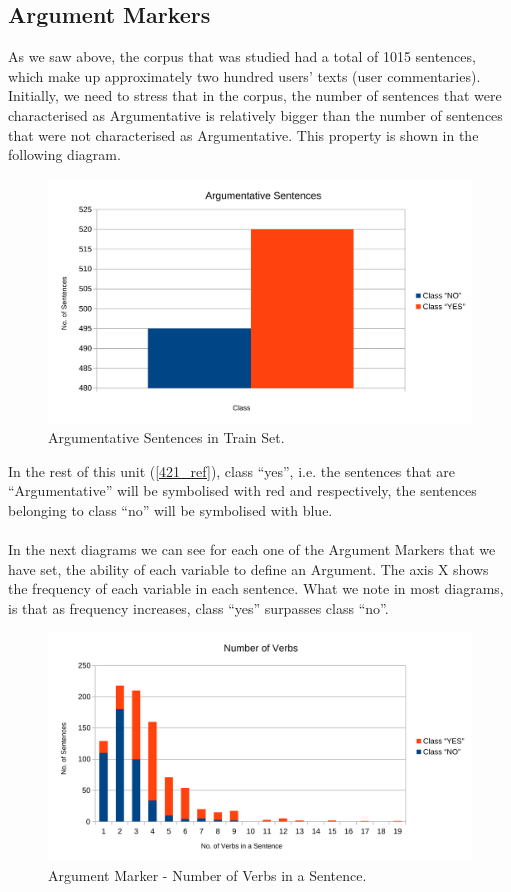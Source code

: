 \subsection{Argument Markers}\label{411_ref}
As we saw above, the corpus that was studied had a total of 1015 sentences, which make up approximately two hundred users' texts (user commentaries). Initially, we need to stress that in the corpus, the number of sentences that were characterised as Argumentative is relatively bigger than the number of sentences that were not characterised as Argumentative. This property is shown in the following diagram.
\begin{figure}[H]
\centering
\includegraphics[width=0.9\linewidth]{figure/arguments/A_argumentative1.pdf}
\caption{Argumentative Sentences in Train Set.}
\end{figure}

In the rest of this unit (\ref{421_ref}), class ``yes'', i.e. the sentences that are ``Argumentative'' will be symbolised with red and respectively, the sentences belonging to class ``no'' will be symbolised with blue.\\
\\
In the next diagrams we can see  for each one of the Argument Markers that we have set, the ability of each variable to define an Argument. The axis X shows the frequency of each variable in each sentence. What we note in most diagrams, is that as frequency increases, class ``yes'' surpasses class ``no''.

\begin{figure}[H]
\centering
\includegraphics[width=0.8\linewidth]{figure/arguments/A_verbs1.pdf}
\caption{Argument Marker - Number of Verbs in a Sentence.}
\end{figure}

